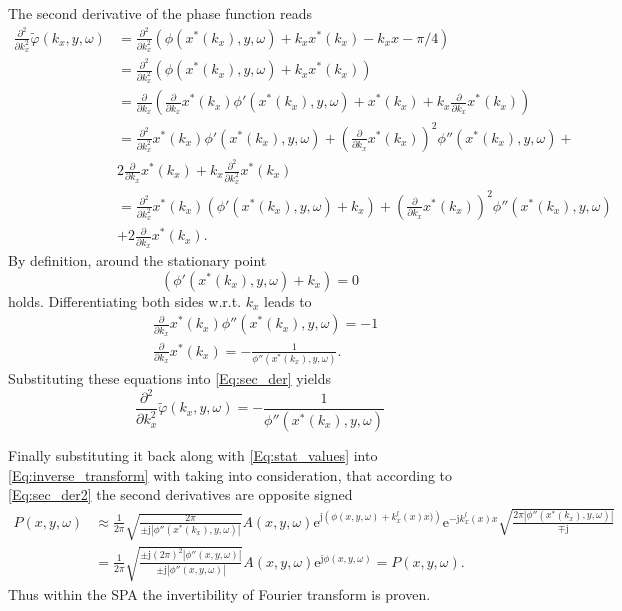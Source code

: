 \documentclass[12pt,a4paper]{article}
\newcommand{\te}{\mathrm{e}}
\newcommand{\ti}{\mathrm{j}}
\begin{document}
\vspace{3mm}
The second derivative of the phase function reads
\begin{align}
\frac{\partial^2}{\partial k_x^2} \tilde{\varphi}(k_x,y,\omega) 
&= \frac{\partial^2}{\partial k_x^2} \left( \phi(x^*(k_x),y,\omega) + k_x x^*(k_x) - k_x x - \pi / 4 \right)
\\
&= \frac{\partial^2}{\partial k_x^2} \left( \phi(x^*(k_x),y,\omega) + k_x x^*(k_x) \right)
\\
&= \frac{\partial}{\partial k_x}\left( \frac{\partial}{\partial k_x} x^*(k_x) \phi'(x^*(k_x),y,\omega) + x^*(k_x)+  k_x \frac{\partial}{\partial k_x}x^*(k_x) \right)
\\
&= \frac{\partial^2}{\partial k_x^2}x^*(k_x)  \phi'(x^*(k_x),y,\omega)+ \left(\frac{\partial}{\partial k_x} x^*(k_x)\right)^2 \phi''(x^*(k_x),y,\omega) + \\
& 2\frac{\partial}{\partial k_x} x^*(k_x) + k_x\frac{\partial^2}{\partial k_x^2}x^*(k_x)
\\
&= \frac{\partial^2}{\partial k_x^2}x^*(k_x)  \left(  \phi'(x^*(k_x),y,\omega)+ k_x\right) + 
\left(\frac{\partial}{\partial k_x} x^*(k_x)\right)^2 \phi''(x^*(k_x),y,\omega) \\
& +2\frac{\partial}{\partial k_x} x^*(k_x).
\label{Eq:sec_der}
\end{align}
By definition, around the stationary point 
\begin{equation}
\left(  \phi'(x^*(k_x),y,\omega)+ k_x\right) = 0
\end{equation}
holds. Differentiating both sides w.r.t. $k_x$ leads to
\begin{align}
&\frac{\partial}{\partial k_x} x^*(k_x) \phi''(x^*(k_x),y,\omega) = -1 \\
&\frac{\partial}{\partial k_x} x^*(k_x) = -\frac{1}{\phi''(x^*(k_x),y,\omega)}.
\end{align}
Substituting these equations into \eqref{Eq:sec_der} yields
\begin{equation}
\frac{\partial^2}{\partial k_x^2} \tilde{\varphi}(k_x,y,\omega) = -\frac{1}{\phi''(x^*(k_x),y,\omega)}
\label{Eq:sec_der2}
\end{equation}

Finally substituting it back along with \eqref{Eq:stat_values} into \eqref{Eq:inverse_transform} with taking into consideration, that according to \eqref{Eq:sec_der2} the second derivatives are opposite signed
\begin{align}
P(x,y,\omega) &\approx \frac{1}{2\pi} \sqrt{ \frac{ 2\pi }
{ \pm \ti \left|\phi''(x^*(k_x),y,\omega)\right|}} 
A(x,y,\omega) \te^{\ti \left( \phi(x,y,\omega) + k_x^l(x) x) \right)} \te^{-\ti k_x^l(x) x} \sqrt{ \frac{2\pi \left|\phi''(x^*(k_x),y,\omega)\right|}{\mp \ti}} 
\\
&= \frac{1}{2\pi} \sqrt{ \frac{ \pm \ti (2\pi)^2 \left|\phi''(x,y,\omega)\right|}
{ \pm \ti \left|\phi''(x,y,\omega)\right|}} 
A(x,y,\omega) \te^{\ti \phi(x,y,\omega)}  
= P(x,y,\omega).
\end{align}
Thus within the SPA the invertibility of Fourier transform is proven.
\end{document}
